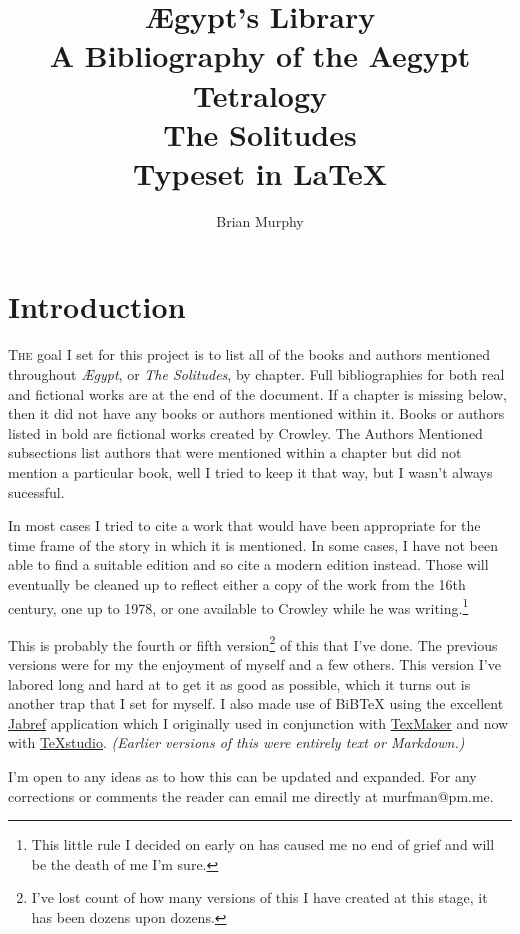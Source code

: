 \documentclass[10pt,makeidx]{extreport}
\author{Brian Murphy}
\title{
 {\Huge Ægypt's Library} \\
 {\footnotesize A Bibliography of the Aegypt Tetralogy \\
 \bigskip
 {\Large The Solitudes} \\
 \bigskip
 Typeset in \LaTeX{} \\
 }
}
\date{\begin{small}\today{}\end{small}}
\newcommand\dropcap{\lettrine[lines=4, findent=3pt]}
\newcommand\blankpage{%
    \null
    \thispagestyle{empty}%
    \addtocounter{page}{-1}%
    \newpage%
    \pagestyle{fancy}}
\newcommand{\chapterzodiac}[2]{%
  \chapter[\texorpdfstring{#2}{#2}]{%
    \color{Mahogany}\bfseries
    #2%
    \hfill
    {\shadowtext{{\color{Mahogany}\Huge\Zodiac{#1}}}}%
  }%
}
\begin{document}






\setcounter{tocdepth}{2}
\tableofcontents
\pagestyle{fancy}

\chapterzodiac{12}{Introduction}
\dropcap{T}{he} goal I set for this project is to list all of the books and authors mentioned throughout \textit{Ægypt}, or \textit{The Solitudes}, by chapter. Full bibliographies for both real and fictional works are at the end of the document. If a chapter is missing below, then it did not have any books or authors mentioned within it. Books or authors listed in bold are fictional works created by Crowley. The Authors Mentioned subsections list authors that were mentioned within a chapter but did not mention a particular book, well I tried to keep it that way, but I wasn't always sucessful.

In most cases I tried to cite a work that would have been appropriate for the time frame of the story in which it is mentioned. In some cases, I have not been able to find a suitable edition and so cite a modern edition instead. Those will eventually be cleaned up to reflect either a copy of the work from the 16th century, one up to 1978, or one available to Crowley while he was writing.\footnote{This little rule I decided on early on has caused me no end of grief and will be the death of me I'm sure.}

This is probably the fourth or fifth version\footnote{I've lost count of how many versions of this I have created at this stage, it has been dozens upon dozens.} of this that I've done. The previous versions were for my the enjoyment of myself and a few others. This version I've labored long and hard at to get it as good as possible, which it turns out is another trap that I set for myself. I also made use of {BiBTeX} using the excellent  \href{https://www.jabref.org/}{Jabref} application which I originally used in conjunction with \href{https://www.xm1math.net/texmaker/}{TexMaker} and now with \href{https://texstudio.org/}{TeXstudio}. \textit{(Earlier versions of this were entirely text or Markdown.)} 

I'm open to any ideas as to how this can be updated and expanded. For any corrections or comments the reader can email me directly at murfman@pm.me.
\end{document}
